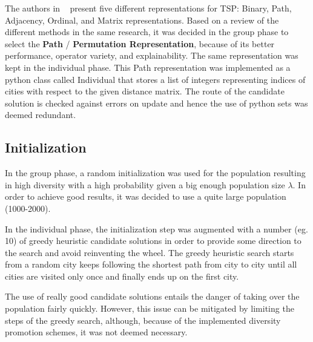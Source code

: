 \documentclass[a4paper,10pt]{article}
\newcommand{\ReplaceMe}[1]{{\color{blue}#1}}
\begin{document}
The authors in ~\cite{davis} present five different representations for TSP: Binary, Path, Adjacency, Ordinal, and Matrix representations. Based on a review of the different methods in the same research, it was decided in the group phase to select the \textbf{Path} / \textbf{Permutation Representation}, because of its better performance, operator variety, and explainability. The same representation was kept in the individual phase. This  Path representation was implemented as a python class called Individual that stores a list of integers representing indices of cities with respect to the given distance matrix. The route of the candidate solution is checked against errors on update and hence the use of python sets was deemed redundant.
\subsection{Initialization}


In the group phase, a random initialization was used for the population resulting in high diversity with a high probability given a big enough population size $\lambda$. In order to achieve good results, it was decided to use a quite large population (1000-2000).

In the individual phase, the initialization step was augmented with a number (eg. 10) of greedy heuristic candidate solutions in order to provide some direction to the search and avoid reinventing the wheel. The greedy heuristic search starts from a random city keeps following the shortest path from city to city until all cities are visited only once and finally ends up on the first city.  

The use of really good candidate solutions entails the danger of taking over the population fairly quickly. However, this issue can be mitigated by limiting the steps of the greedy search, although, because of the implemented diversity promotion schemes, it was not deemed necessary.
\end{document}

